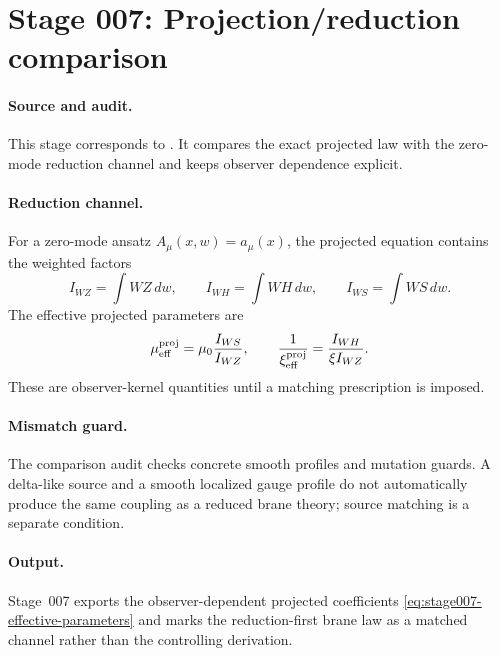 \section[Stage 007]{Stage 007: Projection/reduction comparison}
\label{stage:007}


\paragraph{Source and audit.}
This stage corresponds to
.
It compares the exact projected law with the zero-mode reduction channel and
keeps observer dependence explicit.

\paragraph{Reduction channel.}
For a zero-mode ansatz \(A_\mu(x,w)=a_\mu(x)\), the projected equation contains
the weighted factors
\begin{equation}
\label{eq:stage007-projected-integrals}
I_{WZ}=\int WZ\,dw,\qquad
I_{WH}=\int WH\,dw,\qquad
I_{WS}=\int WS\,dw .
\end{equation}
The effective projected parameters are
\begin{equation}
\label{eq:stage007-effective-parameters}
\mu_{\rm eff}^{\rm proj}=\mu_0\frac{I_{WS}}{I_{WZ}},
\qquad
\frac1{\xi_{\rm eff}^{\rm proj}}=\frac{I_{WH}}{\xi I_{WZ}}.
\end{equation}
These are observer-kernel quantities until a matching prescription is imposed.

\paragraph{Mismatch guard.}
The comparison audit checks concrete smooth profiles and mutation guards.  A
delta-like source and a smooth localized gauge profile do not automatically
produce the same coupling as a reduced brane theory; source matching is a
separate condition.

\paragraph{Output.}
Stage~007 exports the observer-dependent projected coefficients
\eqref{eq:stage007-effective-parameters} and marks the reduction-first
brane law as a matched channel rather than the controlling derivation.
